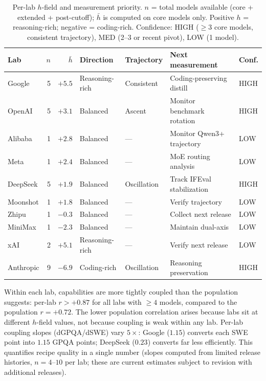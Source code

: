 \documentclass{article}
\begin{document}
\begin{table}[h]
\centering
\caption{Per-lab $h$-field and measurement priority.
$n$ = total models available (core + extended + post-cutoff);
$\bar{h}$ is computed on core models only.
Positive $h$ = reasoning-rich; negative = coding-rich.
Confidence: HIGH ($\geq$3 core models, consistent trajectory),
MED (2--3 or recent pivot), LOW (1 model).}
\label{tab:hfield}
\begin{tabular}{lrrllll}
\toprule
Lab & $n$ & $\bar{h}$ & Direction & Trajectory & Next measurement & Conf. \\
\midrule
Google & 5 & $+5.5$ & Reasoning-rich & Consistent & Coding-preserving distill & HIGH \\
OpenAI & 5 & $+3.1$ & Balanced & Ascent & Monitor benchmark rotation & HIGH \\
Alibaba & 1 & $+2.8$ & Balanced & --- & Monitor Qwen3+ trajectory & LOW \\
Meta & 1 & $+2.4$ & Balanced & --- & MoE routing analysis & LOW \\
DeepSeek & 5 & $+1.9$ & Balanced & Oscillation & Track IFEval stabilization & HIGH \\
Moonshot & 1 & $+1.8$ & Balanced & --- & Verify trajectory & LOW \\
Zhipu & 1 & $-0.3$ & Balanced & --- & Collect next release & LOW \\
MiniMax & 1 & $-2.3$ & Balanced & --- & Maintain dual-axis & LOW \\
xAI & 2 & $+5.1$ & Reasoning-rich & --- & Verify next release & LOW \\
Anthropic & 9 & $-6.9$ & Coding-rich & Oscillation & Reasoning preservation & HIGH \\
\bottomrule
\end{tabular}
\end{table}

Within each lab, capabilities are more tightly coupled than the population suggests:
per-lab $r > +0.87$ for all labs with $\geq 4$ models,
compared to the population $r = +0.72$.
The lower population correlation arises because labs sit at different $h$-field values,
not because coupling is weak within any lab.
Per-lab coupling slopes (dGPQA/dSWE) vary $5\times$:
Google ($1.15$) converts each SWE point into $1.15$ GPQA points;
DeepSeek ($0.23$) converts far less efficiently.
This quantifies recipe quality in a single number
(slopes computed from limited release histories, $n = 4$--$10$ per lab;
these are current estimates subject to revision with additional releases).
\end{document}
